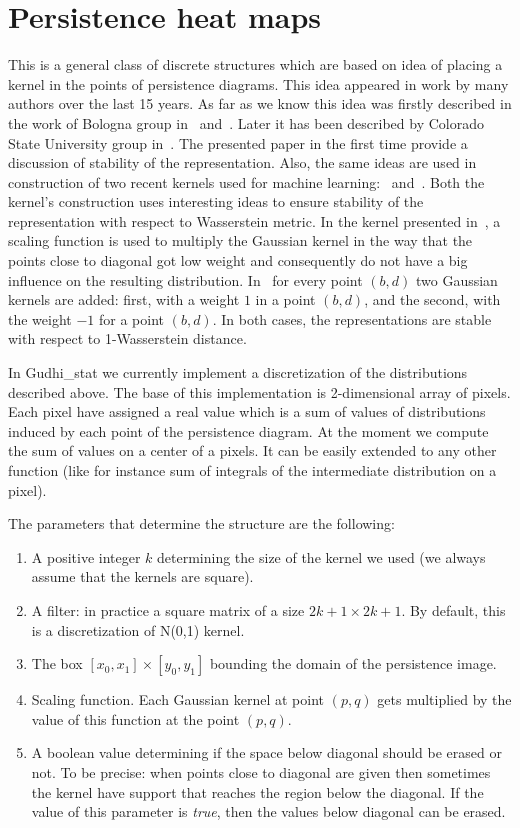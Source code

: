 \documentclass[11pt]{article}
\begin{document}
\section{Persistence heat maps}
This is a general class of discrete structures which are based on idea of placing a kernel in the points of persistence diagrams. This idea appeared in work by many authors over the last 15 years. As far as we know this idea was firstly described in the work of Bologna group in~\cite{bologna1} and~\cite{bologna2}. Later it has been described by Colorado State University group in~\cite{Henry}. The presented paper in the first time provide a discussion of stability of the representation. Also, the same ideas are used in construction of two recent kernels used for machine learning:~\cite{yasu} and~\cite{uli}. Both the kernel's construction uses interesting ideas to ensure stability of the representation with respect to Wasserstein metric. In the kernel presented in~\cite{yasu}, a scaling function is used to multiply the Gaussian kernel in the way that the points close to diagonal got low weight and consequently do not have a big influence on the resulting distribution. In~\cite{uli} for every point $(b,d)$ two Gaussian kernels are added: first, with a weight $1$ in a point $(b,d)$, and the second, with the weight $-1$ for a point $(b,d)$. In both cases, the representations are stable with respect to 1-Wasserstein distance.

In Gudhi\_stat we currently implement a discretization of the distributions described above. The base of this implementation is 2-dimensional array of pixels. Each pixel have assigned a real value which is a sum of values of distributions induced by each point of the persistence diagram. At the moment we compute the sum of values on a center of a pixels. It can be easily extended to any other function (like for instance sum of integrals of the intermediate distribution on a pixel). 

The parameters that determine the structure are the following:
\begin{enumerate}
\item A positive integer $k$ determining the size of the kernel we used (we always assume that the kernels are square).
\item A filter: in practice a square matrix of a size $2k+1 \times 2k+1$. By default, this is a discretization of N(0,1) kernel.
\item The box $[x_0,x_1]\times [y_0,y_1]$ bounding the domain of the persistence image. 
\item Scaling function. Each Gaussian kernel at point $(p,q)$ gets multiplied by the value of this function at the point $(p,q)$. 
\item A boolean value determining if the space below diagonal should be erased or not. To be precise: when points close to diagonal are given then sometimes the kernel have support that reaches the region below the diagonal. If the value of this parameter is \emph{true}, then the values below diagonal can be erased. 
\end{enumerate}
\end{document}

